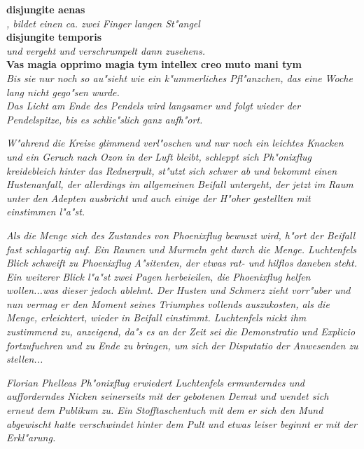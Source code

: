 \documentclass[a5paper,8pt]{book}
\begin{document}
\textbf{disjungite aenas}\\

\textit{, bildet einen ca. zwei Finger langen St"angel }\\

\textbf{disjungite temporis}\\

\textit{und vergeht und verschrumpelt dann zusehens.}\\

\textbf{Vas magia opprimo magia tym intellex creo muto mani tym}\\

\textit{Bis sie nur noch so au"sieht wie ein k"ummerliches Pfl"anzchen, das eine Woche lang nicht gego"sen wurde.}\\

\textit{Das Licht am Ende des Pendels wird langsamer und folgt wieder der Pendelspitze, bis es schlie"slich ganz aufh"ort.}

\textit{W"ahrend die Kreise glimmend verl"oschen und nur noch ein leichtes Knacken und ein Geruch nach Ozon in der Luft bleibt, schleppt sich Ph"onixflug kreidebleich hinter das Rednerpult, st"utzt sich schwer ab und bekommt einen Hustenanfall, der allerdings im allgemeinen Beifall untergeht, der jetzt im Raum unter den Adepten ausbricht und auch einige der H"oher gestellten mit einstimmen l"a"st. }

\textit{Als die Menge sich des Zustandes von Phoenixflug bewuszt wird, h"ort der Beifall fast schlagartig auf. Ein Raunen und Murmeln geht durch die Menge. Luchtenfels Blick schweift zu Phoenixflug A"sitenten, der etwas rat- und hilflos daneben steht. Ein weiterer Blick l"a"st zwei Pagen herbeieilen, die Phoenixflug helfen wollen...was dieser jedoch ablehnt. Der Husten und Schmerz zieht vorr"uber und nun vermag er den Moment seines Triumphes vollends auszukosten, als die Menge, erleichtert, wieder in Beifall einstimmt. Luchtenfels nickt ihm zustimmend zu, anzeigend, da"s es an der Zeit sei die Demonstratio und Explicio fortzufuehren und zu Ende zu bringen, um sich der Disputatio der Anwesenden zu stellen... }

\textit{Florian Phelleas Ph"onixflug erwiedert Luchtenfels ermunterndes und aufforderndes Nicken seinerseits mit der gebotenen Demut und wendet sich erneut dem Publikum zu. Ein Stofftaschentuch mit dem er sich den Mund abgewischt hatte verschwindet hinter dem Pult und etwas leiser beginnt er mit der Erkl"arung.}
\end{document}
